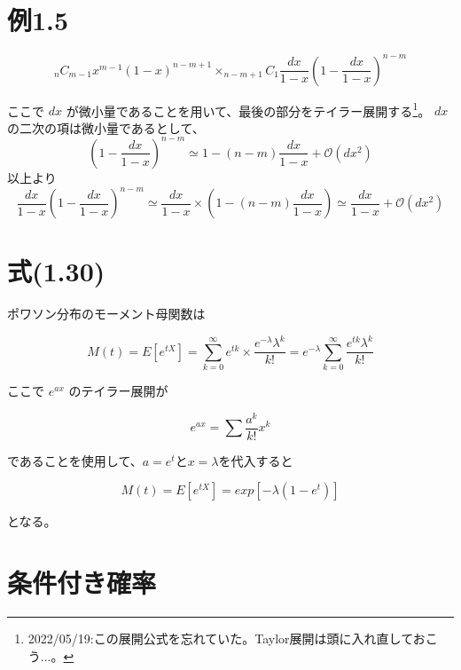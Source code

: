 \documentclass[10pt,a4paper]{ltjsarticle}
\begin{document}
\section{例1.5}

\begin{equation}
    _nC_{m-1}x^{m-1}(1-x)^{n-m+1}\times _{n-m+1}C_1\frac{dx}{1-x}\left(1-\frac{dx}{1-x}\right)^{n-m}
\end{equation}

ここで $dx$ が微小量であることを用いて、最後の部分をテイラー展開する\footnote{2022/05/19:この展開公式を忘れていた。Taylor展開は頭に入れ直しておこう...。}。
$dx$の二次の項は微小量であるとして、
\begin{equation}
  \left(1-\frac{dx}{1-x}\right)^{n-m} \simeq 1-(n-m)\frac{dx}{1-x} + \mathcal{O}\left(dx^2\right)
\end{equation}
以上より
\begin{equation}
\frac{dx}{1-x}\left(1-\frac{dx}{1-x}\right)^{n-m} \simeq \frac{dx}{1-x} \times \left( 1-(n-m)\frac{dx}{1-x} \right) \simeq \frac{dx}{1-x} + \mathcal{O}\left(dx^2\right)
\end{equation}

\section{式(1.30)}

ポワソン分布のモーメント母関数は

\begin{equation}
  M(t) = E[e^{tX}] = \sum_{k=0}^{\infty} e^{tk}\times \frac{e^{-\lambda}\lambda^k}{k!} = e^{-\lambda }\sum_{k=0}^{\infty} \frac{e^{tk}\lambda^k}{k!}
\end{equation}

ここで $e^{ax}$ のテイラー展開が

\begin{equation}
  e^{ax} = \sum \frac{a^k}{k!} x^k
\end{equation}

であることを使用して、$a=e^t$と$x=\lambda$を代入すると

\begin{equation}
  M(t) = E[e^{tX}] = exp[-\lambda(1-e^t)]
\end{equation}

となる。

\section{条件付き確率}
\end{document}
